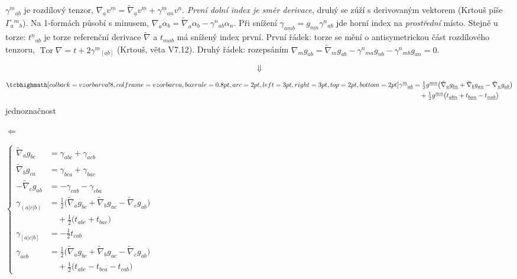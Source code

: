 \begin{vysvetleni}
$\gamma^{\underline{m}}{}_{\underline{ab}}$ je rozdílový tenzor, $\nabla_{\underline{a}}v^{\underline{m}}=\tilde\nabla_{\underline{a}}v^{\underline{m}}+\gamma^{\underline{m}}{}_{\underline{an}}v^{\underline{n}}$. \emph{První dolní index je směr derivace}, druhý se zúží s derivovaným vektorem (Krtouš píše $\Gamma_a{}^m{}_b$). Na 1-formách působí s minusem, $\nabla_a\alpha_b=\tilde\nabla_a\alpha_b-\gamma^n{}_{ab}\alpha_n$.
Při snížení $\gamma_{\underline{amb}}=g_{\underline{mn}}\gamma^{\underline{n}}{}_{\underline{ab}}$ jde horní index na \emph{prostřední} místo. Stejně u torze: $t^{\underline{n}}{}_{\underline{ab}}$ je torze referenční derivace $\tilde\nabla$ a $t_{\underline{mab}}$ má snížený index první.
První řádek: torze se mění o antisymetrickou část rozdílového tenzoru, $\operatorname{Tor}\nabla=t+2\gamma^{\underline{m}}{}_{[\underline{ab}]}$ (Krtouš, věta V7.12). Druhý řádek: rozepsáním $\nabla_mg_{ab}=\tilde\nabla_mg_{ab}-\gamma^n{}_{ma}g_{nb}-\gamma^n{}_{mb}g_{an}=0$.
\end{vysvetleni}
\[ \Downarrow \]

\begin{minipage}{0.52\textwidth}
\begin{align*}
  \vzorec{\gamma^{\underline{m}}{}_{\underline{ab}}} &= \tfrac12 g^{\underline{mn}}\big(\tilde\nabla_{\underline{a}}g_{\underline{bn}} + \tilde\nabla_{\underline{b}}g_{\underline{an}} - \tilde\nabla_{\underline{n}}g_{\underline{ab}}\big) \\
  &\quad + \tfrac12 g^{\underline{mn}}\big(t_{\underline{abn}} + t_{\underline{ban}} - t_{\underline{nab}}\big)
\end{align*}
\quad jednoznačnost
\end{minipage}
$\Leftarrow$
\begin{minipage}{0.44\textwidth}
\small
$\left\{\begin{aligned}
  \tilde\nabla_ag_{bc} &= \gamma_{abc} + \gamma_{acb} \\
  \tilde\nabla_bg_{ca} &= \gamma_{bca} + \gamma_{bac} \\
  -\tilde\nabla_cg_{ab} &= -\gamma_{cab} - \gamma_{cba} \\
  \gamma_{(a|c|b)} &= \tfrac12\big(\tilde\nabla_ag_{bc} + \tilde\nabla_bg_{ac} - \tilde\nabla_cg_{ab}\big) \\
    &\quad + \tfrac12\big(t_{abc} + t_{bac}\big) \\
  \gamma_{[a|c|b]} &= -\tfrac12 t_{cab} \\
  \gamma_{acb} &= \tfrac12\big(\tilde\nabla_ag_{bc} + \tilde\nabla_bg_{ac} - \tilde\nabla_cg_{ab}\big) \\
    &\quad + \tfrac12\big(t_{abc} - t_{bca} - t_{cab}\big)
\end{aligned}\right.$
\end{minipage}

